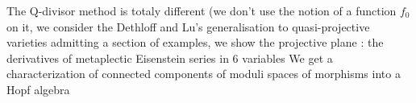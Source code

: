 \documentclass[10pt,a4paper]{article}
\begin{document}
The Q-divisor method is totaly different (we don't use the notion of a function $f_0$ on it, we consider the Dethloff and Lu's generalisation to quasi-projective varieties admitting a section of examples, we show the projective plane : the derivatives of metaplectic Eisenstein series in 6 variables
We get a characterization of connected components of moduli spaces of morphisms into a Hopf algebra
\end{document}
